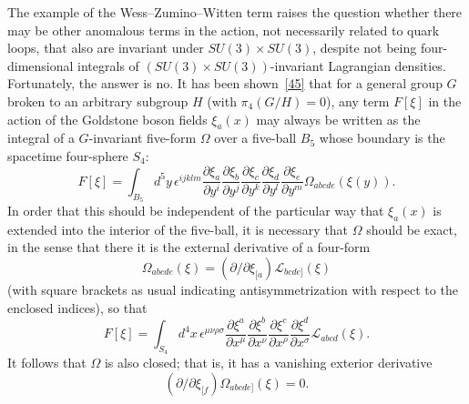 The example of the Wess--Zumino--Witten term raises the question whether there may be other anomalous terms in the action, not necessarily related to quark loops, that also are invariant under $SU(3)\times SU(3)$, despite not being four-dimensional integrals of $(SU(3)\times SU(3))$-invariant Lagrangian densities. Fortunately, the answer is no. It has been shown~\hyperref[ch19-ref-45]{[45]} that for a general group $G$ broken to an arbitrary subgroup $H$ (with $\pi_4(G/H)=0$), any term $F[\xi]$ in the action of the Goldstone boson fields $\xi_a(x)$ may always be written as the integral of a $G$-invariant five-form $\Omega$ over a five-ball $B_5$ whose boundary is the spacetime four-sphere $S_4$:
\begin{equation}
F[\xi]
=\int_{B_5}d^5y\,\epsilon^{ijklm}
\frac{\partial\xi_a}{\partial y^i}
\frac{\partial\xi_b}{\partial y^j}
\frac{\partial\xi_c}{\partial y^k}
\frac{\partial\xi_d}{\partial y^l}
\frac{\partial\xi_e}{\partial y^m}
\Omega_{abcde}(\xi(y)).
\tag{19.8.8}\label{eq:19.8.8}
\end{equation}
In order that this should be independent of the particular way that $\xi_a(x)$ is extended into the interior of the five-ball, it is necessary that $\Omega$ should be exact, in the sense that there it is the external derivative of a four-form
\begin{equation}
\Omega_{abcde}(\xi)
=\left(\partial/\partial\xi_{[a}\right)\mathcal L_{bcde]}(\xi)
\tag{19.8.9}\label{eq:19.8.9}
\end{equation}
(with square brackets as usual indicating antisymmetrization with respect to the enclosed indices), so that
\begin{equation}
F[\xi]
=\int_{S_4}d^4x\,\epsilon^{\mu\nu\rho\sigma}
\frac{\partial\xi^a}{\partial x^\mu}
\frac{\partial\xi^b}{\partial x^\nu}
\frac{\partial\xi^c}{\partial x^\rho}
\frac{\partial\xi^d}{\partial x^\sigma}
\mathcal L_{abcd}(\xi).
\tag{19.8.10}\label{eq:19.8.10}
\end{equation}
It follows that $\Omega$ is also closed; that is, it has a vanishing exterior derivative
\begin{equation}
\left(\partial/\partial\xi_{[f}\right)
\Omega_{abcde]}(\xi)=0.
\tag{19.8.11}\label{eq:19.8.11}
\end{equation}

